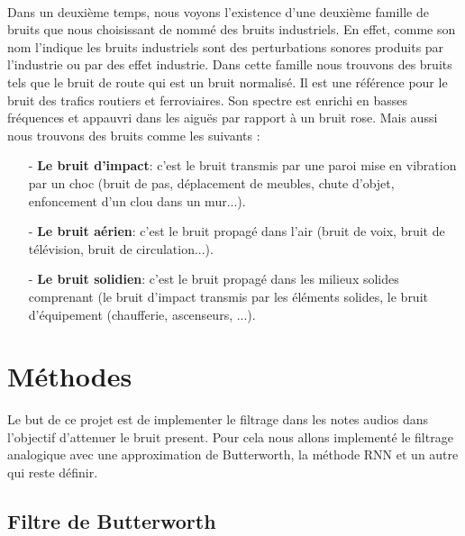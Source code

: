 \documentclass[conference,onecolumn]{IEEEtran}
\begin{document}
\hfill \\
Dans un deuxième temps, nous voyons l’existence d’une deuxième famille de bruits que nous choisissant de nommé des bruits industriels. En effet, comme son nom l’indique les bruits industriels sont des perturbations sonores produits par l’industrie ou par des effet industrie. Dans cette famille nous trouvons des bruits tels que le bruit de route qui est un bruit normalisé. Il est une référence pour le bruit des trafics routiers et ferroviaires. Son spectre est enrichi en basses fréquences et appauvri dans les aiguës par rapport à un bruit rose. Mais aussi nous trouvons des bruits comme les suivants : \\

\begin{itemize}

    \item[-] \textbf{Le bruit d’impact}: c’est le bruit transmis par une paroi mise en vibration par un choc (bruit de pas, déplacement de meubles, chute d’objet, enfoncement d’un clou dans un mur...).
    \item[-] \textbf{Le bruit aérien}: c’est le bruit propagé dans l’air (bruit de voix, bruit de télévision, bruit de circulation...). 
    \item[-] \textbf{Le bruit solidien}: c’est le bruit propagé dans les milieux solides comprenant (le bruit d’impact transmis par les éléments solides, le bruit d’équipement (chaufferie, ascenseurs, ...). 
    
\end{itemize}

\clearpage
\section{Méthodes}
Le but de ce projet est de implementer le filtrage dans les notes audios dans l'objectif d'attenuer le bruit present. Pour cela nous allons implementé le filtrage analogique avec une approximation de Butterworth, la méthode RNN et un autre qui reste définir.

\subsection{\textbf{Filtre de Butterworth}}
\end{document}
